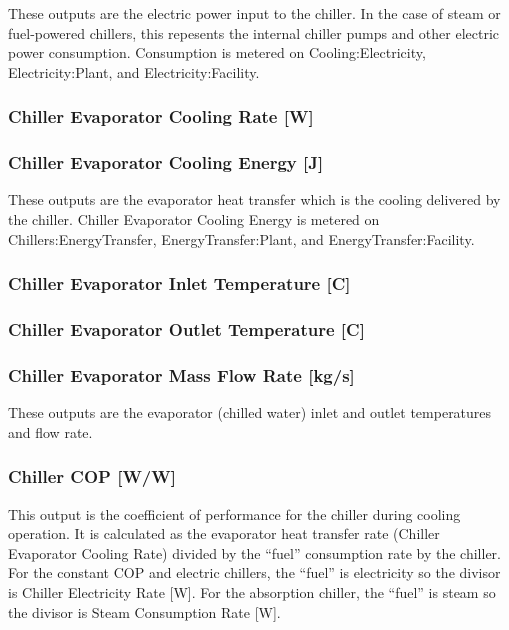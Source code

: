 These outputs are the electric power input to the chiller. In the case of steam or fuel-powered chillers, this repesents the internal chiller pumps and other electric power consumption. Consumption is metered on Cooling:Electricity, Electricity:Plant, and Electricity:Facility.

\subsubsection{Chiller Evaporator Cooling Rate {[}W{]}}\label{chiller-evaporator-cooling-rate-w}

\subsubsection{Chiller Evaporator Cooling Energy {[}J{]}}\label{chiller-evaporator-cooling-energy-j}

These outputs are the evaporator heat transfer which is the cooling delivered by the chiller. Chiller Evaporator Cooling Energy is metered on Chillers:EnergyTransfer, EnergyTransfer:Plant, and EnergyTransfer:Facility.

\subsubsection{Chiller Evaporator Inlet Temperature {[}C{]}}\label{chiller-evaporator-inlet-temperature-c}

\subsubsection{Chiller Evaporator Outlet Temperature {[}C{]}}\label{chiller-evaporator-outlet-temperature-c}

\subsubsection{Chiller Evaporator Mass Flow Rate {[}kg/s{]}}\label{chiller-evaporator-mass-flow-rate-kgs}

These outputs are the evaporator (chilled water) inlet and outlet temperatures and flow rate.

\subsubsection{Chiller COP {[}W/W{]}}\label{chiller-cop-ww}

This output is the coefficient of performance for the chiller during cooling operation. It is calculated as the evaporator heat transfer rate (Chiller Evaporator Cooling Rate) divided by the ``fuel'' consumption rate by the chiller. For the constant COP and electric chillers, the ``fuel'' is electricity so the divisor is Chiller Electricity Rate {[}W{]}. For the absorption chiller, the ``fuel'' is steam so the divisor is Steam Consumption Rate {[}W{]}.


